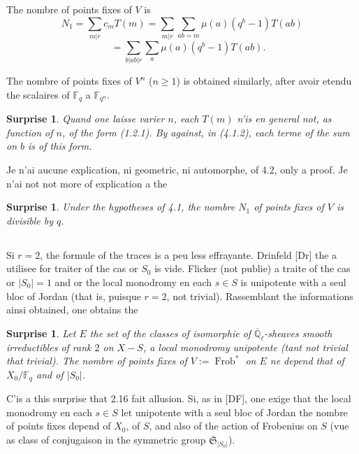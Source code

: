 \documentclass[11pt,a4paper]{article}
\theoremstyle{plain}
\newtheorem{surprise}[theorem]{Surprise}
\theoremstyle{definition}
\DeclareMathOperator{\Frob}{Frob}
\newcommand{\F}{\mathbb{F}}
\newcommand{\Ql}{\overline{\mathbb{Q}}_\ell}
\begin{document}
The nombre of points fixes of $V$ is
\begin{equation}
N_1 = \sum_{m|r} c_m T(m) = \sum_{m|r} \sum_{ab=m} \mu(a)(q^b - 1) T(ab)
\tag{4.1.2}
\end{equation}
\[
\phantom{N_1} = \sum_{b|ab|r} \sum_{a} \mu(a)(q^b - 1) T(ab).
\]

The nombre of points fixes of $V^n$ ($n \geq 1$) is obtained similarly, after avoir etendu the scalaires of $\F_q$ a $\F_{q^n}$.

\begin{surprise}
Quand one laisse varier $n$, each $T(m)$ n'is en general not, as function of $n$, of the form (1.2.1). By against, in (4.1.2), each terme of the sum on $b$ is of this form.
\end{surprise}

Je n'ai aucune explication, ni geometric, ni automorphe, of 4.2, only a proof. Je n'ai not not more of explication a the

\begin{surprise}
Under the hypotheses of 4.1, the nombre $N_1$ of points fixes of $V$ is divisible by $q$.
\end{surprise}

\subsection{}
Si $r = 2$, the formule of the traces is a peu less effrayante. Drinfeld [Dr] the a utilisee for traiter of the cas or $S_0$ is vide. Flicker (not publie) a traite of the cas or $|S_0| = 1$ and or the local monodromy en each $s \in S$ is unipotente with a seul bloc of Jordan (that is, puisque $r = 2$, not trivial). Rassemblant the informations ainsi obtained, one obtains the

\begin{surprise}
Let $E$ the set of the classes of isomorphie of $\Ql$-sheaves smooth irreductibles of rank $2$ on $X - S$, a local monodromy unipotente (tant not trivial that trivial). The nombre of points fixes of $V := \Frob^*$ on $E$ ne depend that of $X_0/\F_q$ and of $|S_0|$.
\end{surprise}

C'is a this surprise that 2.16 fait allusion. Si, as in [DF], one exige that the local monodromy en each $s \in S$ let unipotente with a seul bloc of Jordan the nombre of points fixes depend of $X_0$, of $S$, and also of the action of Frobenius on $S$ (vue as class of conjugaison in the symmetric group $\mathfrak{S}_{|S_0|}$).
\end{document}
